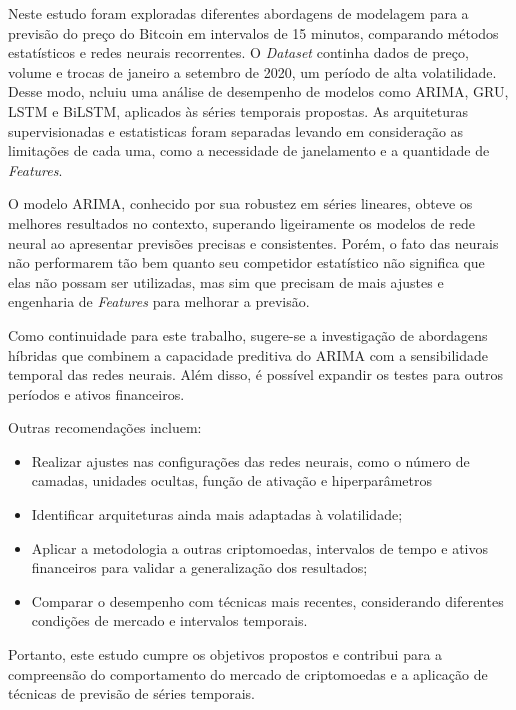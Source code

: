Neste estudo foram exploradas diferentes abordagens de modelagem para a previsão do preço do Bitcoin em intervalos de 15 minutos, comparando métodos estatísticos e redes neurais recorrentes. 
O \textit{Dataset} continha dados de preço, volume e trocas de janeiro a setembro de 2020, um período de alta volatilidade. Desse modo, ncluiu uma análise de desempenho de modelos como ARIMA, GRU, LSTM e BiLSTM, aplicados às séries temporais propostas.
As arquiteturas supervisionadas e estatisticas foram separadas levando em consideração as limitações de cada uma, como a necessidade de janelamento e a quantidade de \textit{Features}.

O modelo ARIMA, conhecido por sua robustez em séries lineares, obteve os melhores resultados no contexto, superando ligeiramente os modelos de rede neural ao apresentar previsões precisas e consistentes.
Porém, o fato das neurais não performarem tão bem quanto seu competidor estatístico não significa que elas não possam ser utilizadas, mas sim que precisam de mais ajustes e engenharia de \textit{Features} para melhorar a previsão.

Como continuidade para este trabalho, sugere-se a investigação de abordagens híbridas que combinem a capacidade preditiva do ARIMA com a sensibilidade temporal das redes neurais. Além disso, é possível expandir os testes para outros períodos e ativos financeiros. 

Outras recomendações incluem:

\begin{itemize}
    \item Realizar ajustes nas configurações das redes neurais, como o número de camadas, unidades ocultas, função de ativação e hiperparâmetros
    \item Identificar arquiteturas ainda mais adaptadas à volatilidade;
    \item Aplicar a metodologia a outras criptomoedas, intervalos de tempo e ativos financeiros para validar a generalização dos resultados;
    \item Comparar o desempenho com técnicas mais recentes, considerando diferentes condições de mercado e intervalos temporais.
\end{itemize}

Portanto, este estudo cumpre os objetivos propostos e contribui para a compreensão do comportamento do mercado de criptomoedas e a aplicação de técnicas de previsão de séries temporais.
